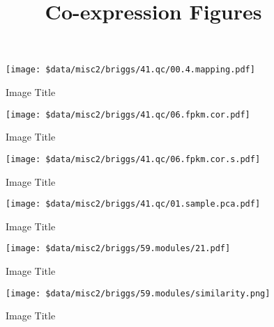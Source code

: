 \documentclass[11pt,]{article}
\title{Co-expression Figures  }
\author{}
\date{}
\begin{document}
    
%

{%
\setlength{\parindent}{0pt}
\thispagestyle{plain}
{\fontsize{18}{20}\selectfont\raggedright 
\maketitle  %

}

{
   \vskip 13.5pt\relax \normalsize\fontsize{11}{12} 
 

}

}






\vskip 6.5pt


\noindent  \begin{figure}
\centering
\texttt{[image: \$data/misc2/briggs/41.qc/00.4.mapping.pdf]}
\caption{Image Title}
\end{figure}

\begin{figure}
\centering
\texttt{[image: \$data/misc2/briggs/41.qc/06.fpkm.cor.pdf]}
\caption{Image Title}
\end{figure}

\begin{figure}
\centering
\texttt{[image: \$data/misc2/briggs/41.qc/06.fpkm.cor.s.pdf]}
\caption{Image Title}
\end{figure}

\begin{figure}
\centering
\texttt{[image: \$data/misc2/briggs/41.qc/01.sample.pca.pdf]}
\caption{Image Title}
\end{figure}

\begin{figure}
\centering
\texttt{[image: \$data/misc2/briggs/59.modules/21.pdf]}
\caption{Image Title}
\end{figure}

\begin{figure}
\centering
\texttt{[image: \$data/misc2/briggs/59.modules/similarity.png]}
\caption{Image Title}
\end{figure}
\end{document}
